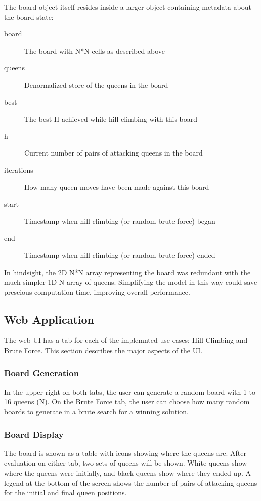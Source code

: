 The board object itself resides inside a larger object containing metadata about the board state:

\begin{description}
\item[board] The board with N*N cells as described above
\item[queens] Denormalized store of the queens in the board
\item[best] The best H achieved while hill climbing with this board
\item[h] Current number of pairs of attacking queens in the board
\item[iterations] How many queen moves have been made against this board
\item[start] Timestamp when hill climbing (or random brute force)  began
\item[end] Timestamp when hill climbing (or random brute force) ended
\end{description}

In hindsight, the 2D N*N array representing the board was redundant with the much simpler 1D N array of queens.
Simplifying the model in this way could save prescious computation time, improving overall performance.

\subsection{Web Application}
The web UI has a tab for each of the implemnted use cases: Hill Climbing and Brute Force. This section describes the
major aspects of the UI.

\subsubsection{Board Generation}
In the upper right on both tabs, the user can generate a random board with 1 to 16 queens (N). On the Brute Force tab,
the user can choose how many random boards to generate in a brute search for a winning solution.

\subsubsection{Board Display}
The board is shown as a table with icons showing where the queens are. After evaluation on either tab, two sets of
queens will be shown. White queens show where the queens were initially, and black queens show where they ended up.
A legend at the bottom of the screen shows the number of pairs of attacking queens for the initial and final queen
positions.

